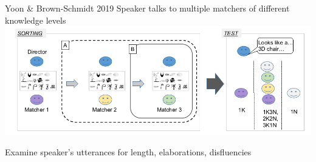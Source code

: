 \documentclass[ 12pt, xcolor=beamer,table,usenames,dvipsnames, ignorenonframetext, ngerman]{beamer}
\begin{document}
\appendix

\begin{frame}{Yoon \& Brown-Schmidt 2019}
Speaker talks to multiple matchers of different knowledge levels\\


\includegraphics[width=\textwidth]{../images/yoon_diagram.png}

Examine speaker's utterances for length, elaborations, disfluencies
\end{frame}
\end{document}
